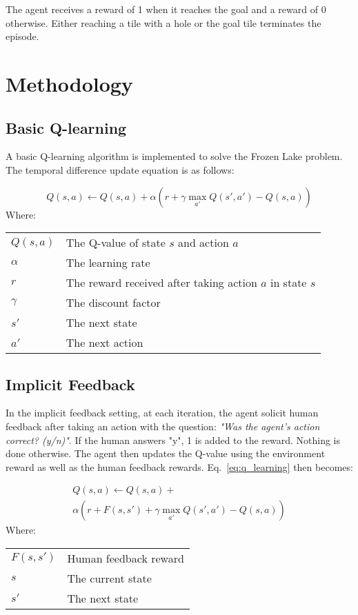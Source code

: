 \documentclass[conference]{IEEEtran}
\makeatletter
\newenvironment{conditions}
  {\par\vspace{\abovedisplayskip}\noindent\begin{tabular}{>{$}l<{$} @{${}={}$} l}}
  {\end{tabular}\par\vspace{\belowdisplayskip}}
\makeatother
\begin{document}
The agent receives a reward of 1 when it reaches the goal and a reward of 0 otherwise. Either reaching a tile with a hole or the goal tile terminates the episode.

\section{Methodology}

\subsection{Basic Q-learning}

A basic Q-learning\cite{watkinsQlearning1992} algorithm is implemented to solve the Frozen Lake problem. The temporal difference update equation is as follows:

\begin{equation}
    Q(s, a) \leftarrow Q(s, a) + \alpha \left( r + \gamma \max_{a'} Q(s', a') - Q(s, a) \right)
    \label{eq:q_learning}
\end{equation}
Where:
\begin{conditions}
    Q(s, a) & The Q-value of state \(s\) and action \(a\) \\
    \alpha  & The learning rate \\
    r       & The reward received after taking action \(a\) in state \(s\) \\
    \gamma  & The discount factor \\
    s'      & The next state \\
    a'      & The next action
\end{conditions}

\subsection{Implicit Feedback}

In the implicit feedback setting, at each iteration, the agent solicit human feedback after taking an action with the question: \textit{"Was the agent's action correct? (y/n)"}. If the human answers "y", 1 is added to the reward. Nothing is done otherwise. The agent then updates the Q-value using the environment reward as well as the human feedback rewards. Eq.~\ref{eq:q_learning} then becomes:

\begin{multline}
    Q(s, a) \leftarrow Q(s, a) + \\
    \alpha \left( r + F(s, s') + \gamma \max_{a'} Q(s', a') - Q(s, a) \right)
    \label{eq:implicit_feedback}
\end{multline}
Where:
\begin{conditions}
    F(s, s') & Human feedback reward \\
    s        & The current state \\
    s'       & The next state \\
\end{conditions}
\end{document}
